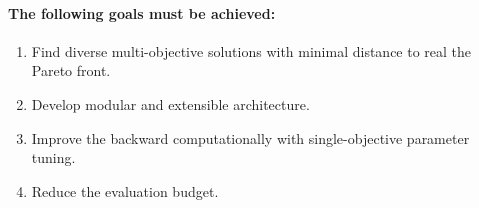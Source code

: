         \paragraph{The following goals must be achieved:}
        \begin{enumerate}
            \item Find diverse multi-objective solutions with minimal distance to real the Pareto front. 
            \item Develop modular and extensible architecture. 
            \item Improve the backward computationally with single-objective parameter tuning.
            \item Reduce the evaluation budget.
        \end{enumerate}



















